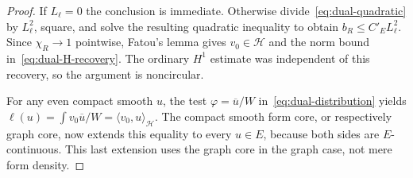 \documentclass[11pt,a4paper]{article}
\numberwithin{equation}{section}
\theoremstyle{definition}
\theoremstyle{remark}
\newcommand{\Hh}{\mathcal H}
\newcommand{\ip}[2]{\langle #1,#2\rangle}
\begin{document}
\begin{proof}
If $L_\ell=0$ the conclusion is immediate. Otherwise divide~\eqref{eq:dual-quadratic} by $L_\ell^2$, square, and solve the resulting quadratic inequality to obtain $b_R\le C'_E L_\ell^2$. Since $\chi_R\to1$ pointwise, Fatou's lemma gives $v_0\in\Hh$ and the norm bound in~\eqref{eq:dual-H-recovery}. The ordinary $H^1$ estimate was independent of this recovery, so the argument is noncircular.

For any even compact smooth $u$, the test $\varphi=\overline u/W$ in~\eqref{eq:dual-distribution} yields
$\ell(u)=\int v_0\overline u/W=\ip{v_0}{u}_{\Hh}$.
The compact smooth form core, or respectively graph core, now extends this equality to every $u\in E$, because both sides are $E$-continuous. This last extension uses the graph core in the graph case, not mere form density.
\end{proof}
\end{document}
